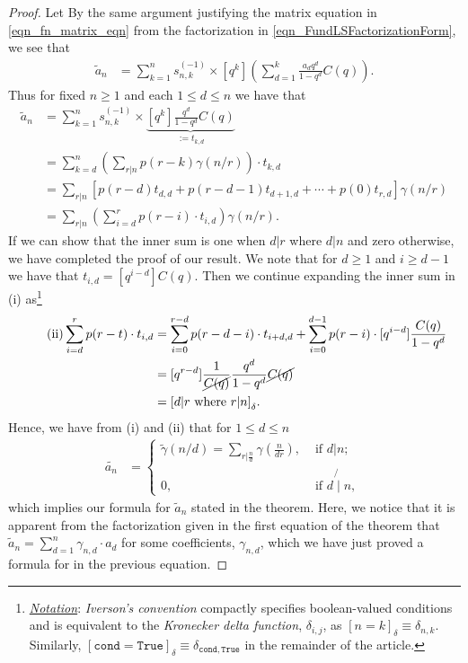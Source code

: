 \documentclass[10pt,reqno]{amsart}
\numberwithin{figure}{section}
\numberwithin{table}{section}
\theoremstyle{plain}
\numberwithin{theorem}{section}
\theoremstyle{remark}
\begin{document}
\begin{proof} 
Let 
By the same argument justifying the matrix equation in \eqref{eqn_fn_matrix_eqn} from the 
factorization in \eqref{eqn_FundLSFactorizationForm}, we see that 
\begin{align*} 
\widetilde{a}_n & = \sum_{k=1}^n s_{n,k}^{(-1)} \times [q^k]\left( 
     \sum_{d=1}^k \frac{a_d q^d}{1-q^d} C(q)\right). 
\end{align*} 
Thus for fixed $n \geq 1$ and each $1 \leq d \leq n$ we have that 
\begin{align*} 
[a_d] \widetilde{a}_n & = \sum_{k=1}^n s_{n,k}^{(-1)} \times 
     \underset{:= t_{k,d}}{\underbrace{[q^k] \frac{q^d}{1-q^d} C(q)}} \\ 
     & = 
     \sum_{k=d}^n \left(\sum_{r|n} p(r-k) \gamma(n/r)\right) \cdot t_{k,d} \\ 
     & = 
     \sum_{r|n} \left[p(r-d) t_{d,d}+p(r-d-1) t_{d+1,d} + \cdots + p(0) t_{r,d}\right] 
     \gamma(n / r) \\ 
\tag{i} 
     & = 
     \sum_{r|n} \left(\sum_{i=d}^r p(r-i) \cdot t_{i,d}\right) \gamma(n/r). 
\end{align*} 
If we can show that the inner sum is one when $d|r$ where $d|n$ and zero otherwise, we have completed the 
proof of our result. 
We note that for $d \geq 1$ and $i \geq d-1$ we have that $t_{i,d} = [q^{i-d}] C(q)$. 
Then we continue expanding the inner sum in (i) as\footnote{ 
     \underline{\emph{Notation}}: 
     \emph{Iverson's convention} compactly specifies 
     boolean-valued conditions and is equivalent to the 
     \emph{Kronecker delta function}, $\delta_{i,j}$, as 
     ${\ensuremath{\left[{n = k}\right]_{\delta}}} \equiv \delta_{n,k}$. 
     Similarly, ${\ensuremath{\left[{\mathtt{cond = True}}\right]_{\delta}}} \equiv 
                 \delta_{\mathtt{cond}, \mathtt{True}}$ 
     in the remainder of the article. 
} 
\begin{align*} 
\tag{ii} 
\sum_{i=d}^r p(r-t) \cdot t_{i,d} & = \sum_{i=0}^{r-d} p(r-d-i) \cdot t_{i+d,d} + 
     \sum_{i=0}^{d-1} p(r-i) \cdot [q^{i-d}] \frac{C(q)}{1-q^d} \\ 
     & = 
     [q^{r-d}] \frac{1}{\cancel{C(q)}} \frac{q^d}{1-q^d} \cancel{C(q)} \\ 
     & = 
     {\ensuremath{\left[{d|r\text{ where }r|n}\right]_{\delta}}}. 
\end{align*} 
Hence, we have from (i) and (ii) that for $1 \leq d \leq n$ 
\begin{align*} 
[a_d] \widetilde{a_n} & = 
     \begin{cases} 
     \widetilde{\gamma}(n/d) = \sum_{r|\frac{n}{d}} \gamma\left(\frac{n}{dr}\right), & 
     \text{ if $d|n$; } \\ 
     0, & \text{ if $d \not{\mid} n$, } 
     \end{cases} 
\end{align*} 
which implies our formula for $\widetilde{a}_n$ stated in the theorem. 
Here, we notice that it is apparent from the factorization given in the first 
equation of the theorem that $\widetilde{a}_n = \sum_{d=1}^n \gamma_{n,d} \cdot a_d$ 
for some coefficients, $\gamma_{n,d}$, which we have just proved a formula for 
in the previous equation. 
\end{proof} 
\end{document}
